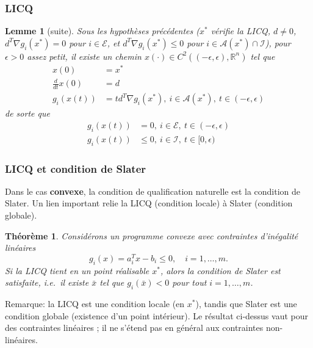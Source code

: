 \documentclass[usepdftitle=false,aspectratio=169]{beamer}
\newtheorem{lem}{Lemme}
\newtheorem{thm}{Théorème}
\def\blue{\color{blue}}
\def\cA{\mathcal{A}}
\def\cE{\mathcal{E}}
\def\cI{\mathcal{I}}
\def\RR{\mathbb{R}}
\begin{document}
\begin{frame}[shrink=2]
\frametitle{LICQ}

\begin{lem}[suite]
Sous les hypothèses précédentes ($x^*$ vérifie la LICQ, $d \ne 0$, $d^T\nabla g_i(x^*)=0$ pour $i\in\cE$, et $d^T\nabla g_i(x^*)\leq 0$ pour $i\in\cA(x^*)\cap\cI$),
pour $\epsilon > 0$ assez petit, il existe un chemin $x(\cdot) \in C^2 \left((-\epsilon, \epsilon), \RR^n \right)$ tel que
\begin{align*}
x(0) &= x^* \\
\frac{d}{dt} x(0) &= d \\
g_i(x(t)) &= td^T\nabla g_i(x^*),\ i \in \cA(x^*),\ t \in (-\epsilon, \epsilon)
\end{align*}
de sorte que
\begin{align*}
g_i(x(t)) &= 0,\ i \in \cE,\ t \in (-\epsilon, \epsilon) \\
g_i(x(t)) &\leq 0,\ i \in \cI,\ t \in [0, \epsilon)
\end{align*}
\end{lem}

\end{frame}

\begin{frame}
\frametitle{LICQ et condition de Slater}

Dans le cas \textbf{convexe}, la condition de qualification naturelle est la condition de Slater.
Un lien important relie la LICQ (condition locale) à Slater (condition globale).

\mbox{}

\begin{thm}
Considérons un programme convexe avec contraintes d'inégalité linéaires
$$
g_i(x) = a_i^T x - b_i \leq 0,\quad i = 1,\ldots,m.
$$
Si la LICQ tient en un point réalisable $x^*$, alors la condition de Slater est satisfaite,
i.e.\ il existe $\bar{x}$ tel que $g_i(\bar{x}) < 0$ pour tout $i = 1,\ldots,m$.
\end{thm}

\mbox{}

{\blue Remarque}: la LICQ est une condition locale (en $x^*$), tandis que Slater est
une condition globale (existence d'un point intérieur).
Le résultat ci-dessus vaut pour des contraintes linéaires ; il ne s'étend pas en général
aux contraintes non-linéaires.

\end{frame}
\end{document}
